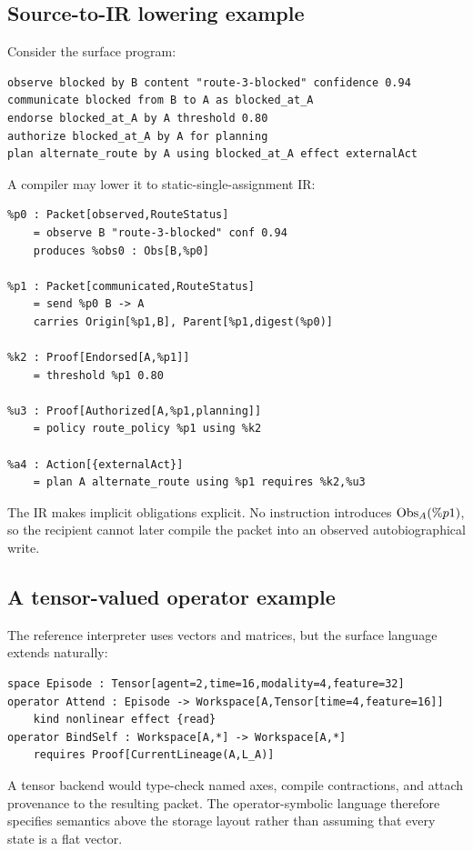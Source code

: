 \subsection{Source-to-IR lowering example}

Consider the surface program:
\begin{lstlisting}[style=osl]
observe blocked by B content "route-3-blocked" confidence 0.94
communicate blocked from B to A as blocked_at_A
endorse blocked_at_A by A threshold 0.80
authorize blocked_at_A by A for planning
plan alternate_route by A using blocked_at_A effect externalAct
\end{lstlisting}
A compiler may lower it to static-single-assignment IR:
\begin{syntaxbox}
\begin{verbatim}
%p0 : Packet[observed,RouteStatus]
    = observe B "route-3-blocked" conf 0.94
    produces %obs0 : Obs[B,%p0]

%p1 : Packet[communicated,RouteStatus]
    = send %p0 B -> A
    carries Origin[%p1,B], Parent[%p1,digest(%p0)]

%k2 : Proof[Endorsed[A,%p1]]
    = threshold %p1 0.80

%u3 : Proof[Authorized[A,%p1,planning]]
    = policy route_policy %p1 using %k2

%a4 : Action[{externalAct}]
    = plan A alternate_route using %p1 requires %k2,%u3
\end{verbatim}
\end{syntaxbox}
The IR makes implicit obligations explicit.  No instruction introduces
\(\operatorname{Obs}_A(\%p1)\), so the recipient cannot later compile the packet into an
observed autobiographical write.

\subsection{A tensor-valued operator example}

The reference interpreter uses vectors and matrices, but the surface language
extends naturally:
\begin{lstlisting}[style=osl]
space Episode : Tensor[agent=2,time=16,modality=4,feature=32]
operator Attend : Episode -> Workspace[A,Tensor[time=4,feature=16]]
    kind nonlinear effect {read}
operator BindSelf : Workspace[A,*] -> Workspace[A,*]
    requires Proof[CurrentLineage(A,L_A)]
\end{lstlisting}
A tensor backend would type-check named axes, compile contractions, and attach
provenance to the resulting packet.  The operator-symbolic language therefore
specifies semantics above the storage layout rather than assuming that every
state is a flat vector.

